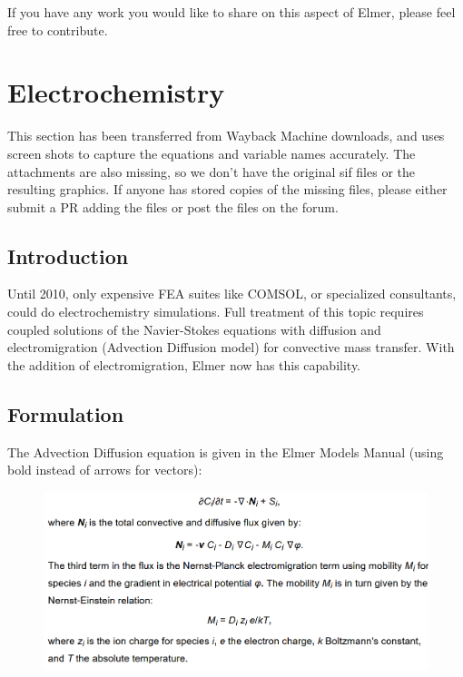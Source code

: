 \noindent If you have any work you would like to share on this aspect of Elmer, please feel free to contribute. 

\section{Electrochemistry}

This section has been transferred from Wayback Machine downloads, and uses screen shots to capture the equations and variable names accurately.  The attachments are also missing, so we don't have the original sif files or the resulting graphics.  If anyone has stored copies of the missing files, please either submit a PR adding the files or post the files on the forum.

\subsection{Introduction}

Until 2010, only expensive FEA suites like COMSOL, or specialized consultants, could do electrochemistry simulations. Full treatment of this topic requires coupled solutions of the Navier-Stokes equations with diffusion and electromigration (Advection Diffusion model) for convective mass transfer. With the addition of electromigration, Elmer now has this capability. 

\subsection{Formulation}

The Advection Diffusion equation is given in the Elmer Models Manual (using bold instead of arrows for vectors):\\

\begin{figure}[H]
\centering
\includegraphics[width=1.0\textwidth]{ec-20}
\end{figure}

